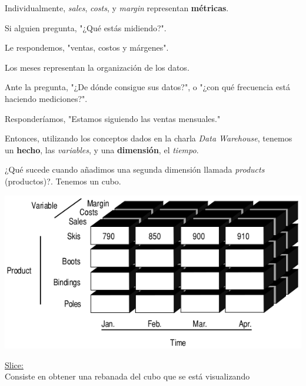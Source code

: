 \documentclass{fancyslides}
\begin{document}
\begin{frame}
\misc
{
Individualmente, \textit{sales}, \textit{costs}, y \textit{margin} representan \textbf{métricas}.

Si alguien pregunta, "¿Qué estás midiendo?".

Le respondemos, "ventas, costos y márgenes".

Los meses representan la organización de los datos.

Ante la pregunta, "¿De dónde consigue sus datos?", o "¿con qué frecuencia está haciendo mediciones?".

Responderíamos, "Estamos siguiendo las ventas mensuales."
\newline


Entonces, utilizando los conceptos dados en la charla \textit{Data Warehouse}, tenemos un \textbf{hecho}, las \textit{variables},
y una \textbf{dimensión}, el \textit{tiempo}.
}
\end{frame}

\begin{frame}
\misc
{
¿Qué sucede cuando añadimos una segunda dimensión llamada \textit{products} (productos)?.
Tenemos un cubo.

\begin{center}
\includegraphics[scale=0.4]{cube_2}
\end{center}
}
\end{frame}


\begin{frame}
\end{frame}


\begin{frame}
\misc
{
  \underline{Slice:}\\
  Consiste en obtener una rebanada del cubo que se está visualizando
}
\end{frame}
\end{document}
